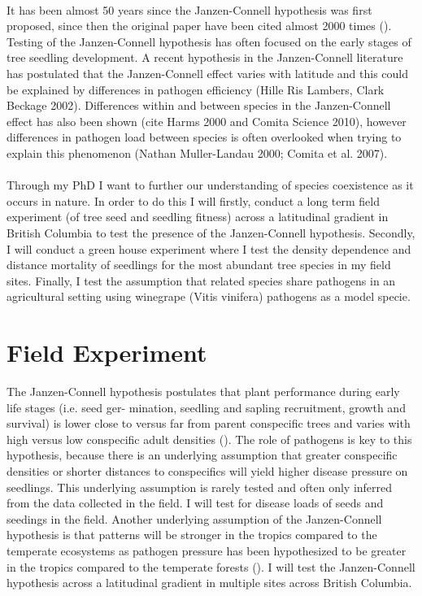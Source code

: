 \documentclass{article}
\begin{document}
\paragraph{}It has been almost 50 years since the Janzen-Connell hypothesis was first proposed, since then the original paper have been cited almost 2000 times (\citep{Comita2014}). Testing of the Janzen-Connell hypothesis has often focused on the early stages of tree seedling development. A recent hypothesis in the Janzen-Connell literature has postulated that the Janzen-Connell effect varies with latitude and this could be explained by differences in pathogen efficiency (Hille Ris Lambers, Clark Beckage 2002). Differences within and between species in the Janzen-Connell effect has also been shown (cite Harms 2000 and Comita Science 2010), however differences in pathogen load between species is often overlooked when trying to explain this phenomenon (Nathan Muller-Landau 2000; Comita et al. 2007). 

\paragraph{}Through my PhD I want to further our understanding of species coexistence as it occurs in nature. In order to do this I will firstly, conduct a long term field experiment (of tree seed and seedling fitness) across a latitudinal gradient in British Columbia to test the presence of the Janzen-Connell hypothesis. Secondly, I will conduct a green house experiment where I test the density dependence and distance mortality of seedlings for the most abundant tree species in my field sites. Finally, I test the assumption that related species share pathogens in an agricultural setting using winegrape (Vitis vinifera) pathogens as a model specie. 

\section{Field Experiment}
The Janzen-Connell hypothesis postulates that plant performance during early life stages (i.e. seed ger- mination, seedling and sapling recruitment, growth and survival) is lower close to versus far from parent conspecific trees and varies with high versus low conspecific adult densities (\citep{Comita2014}). The role of pathogens is key to this hypothesis, because there is an underlying assumption that greater conspecific densities or shorter distances to conspecifics will yield higher disease pressure on seedlings. This underlying assumption is rarely tested and often only inferred from the data collected in the field. I will test for disease loads of seeds and seedings in the field. Another underlying assumption of the Janzen-Connell hypothesis is that patterns will be stronger in the tropics compared to the temperate ecosystems as pathogen pressure has been hypothesized to be greater in the tropics compared to the temperate forests (\citep{Comita2014}). I will test the Janzen-Connell hypothesis across a latitudinal gradient in multiple sites across British Columbia. 
\end{document}
